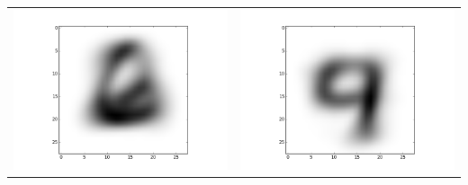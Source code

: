 \documentclass[11pt]{article}
\begin{document}
\begin{tabular}{cc}
\includegraphics[scale=0.4]{images/10-images/4} & \includegraphics[scale=0.4]{images/10-images/5} \\

\end{tabular}
\end{document}

